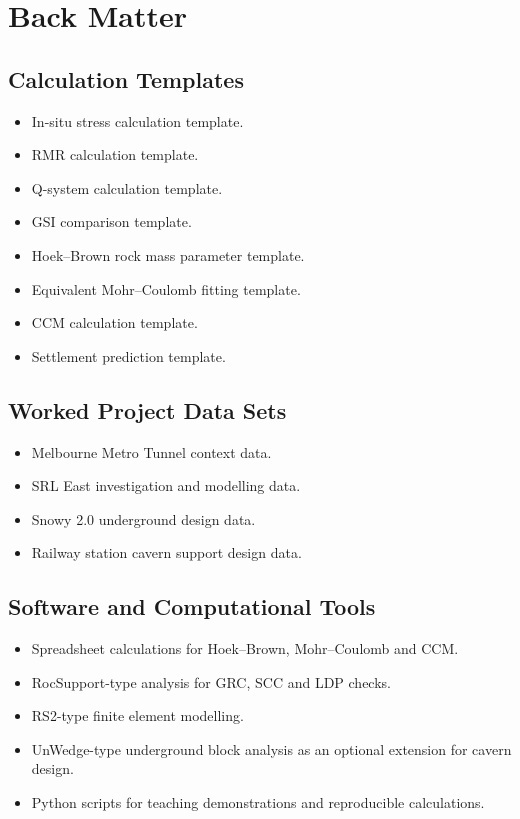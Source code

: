 \documentclass[12pt,oneside]{book}
\begin{document}
\part{Back Matter}

\appendix

\chapter{Calculation Templates}
\begin{itemize}
    \item In-situ stress calculation template.
    \item RMR calculation template.
    \item Q-system calculation template.
    \item GSI comparison template.
    \item Hoek--Brown rock mass parameter template.
    \item Equivalent Mohr--Coulomb fitting template.
    \item CCM calculation template.
    \item Settlement prediction template.
\end{itemize}

\chapter{Worked Project Data Sets}
\begin{itemize}
    \item Melbourne Metro Tunnel context data.
    \item SRL East investigation and modelling data.
    \item Snowy 2.0 underground design data.
    \item Railway station cavern support design data.
\end{itemize}

\chapter{Software and Computational Tools}
\begin{itemize}
    \item Spreadsheet calculations for Hoek--Brown, Mohr--Coulomb and CCM.
    \item RocSupport-type analysis for GRC, SCC and LDP checks.
    \item RS2-type finite element modelling.
    \item UnWedge-type underground block analysis as an optional extension for cavern design.
    \item Python scripts for teaching demonstrations and reproducible calculations.
\end{itemize}
\end{document}
